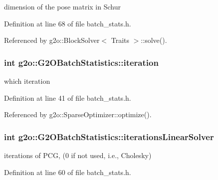 dimension of the pose matrix in Schur 



Definition at line 68 of file batch\+\_\+stats.\+h.



Referenced by g2o\+::\+Block\+Solver$<$ Traits $>$\+::solve().

\subsubsection[{\texorpdfstring{iteration}{iteration}}]{\setlength{\rightskip}{0pt plus 5cm}int g2o\+::\+G2\+O\+Batch\+Statistics\+::iteration}\hypertarget{structg2o_1_1G2OBatchStatistics_a63e30077b9dad65c321b322a2a6f0aea}{}\label{structg2o_1_1G2OBatchStatistics_a63e30077b9dad65c321b322a2a6f0aea}


which iteration 



Definition at line 41 of file batch\+\_\+stats.\+h.



Referenced by g2o\+::\+Sparse\+Optimizer\+::optimize().

\subsubsection[{\texorpdfstring{iterations\+Linear\+Solver}{iterationsLinearSolver}}]{\setlength{\rightskip}{0pt plus 5cm}int g2o\+::\+G2\+O\+Batch\+Statistics\+::iterations\+Linear\+Solver}\hypertarget{structg2o_1_1G2OBatchStatistics_a0ef94423b56f6d842e33a7c277c930a0}{}\label{structg2o_1_1G2OBatchStatistics_a0ef94423b56f6d842e33a7c277c930a0}


iterations of P\+CG, (0 if not used, i.\+e., Cholesky) 



Definition at line 60 of file batch\+\_\+stats.\+h.

